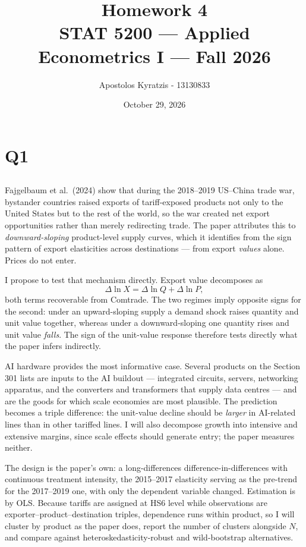 \documentclass[11pt]{article}
\title{\vspace{-2em}Homework 4\\[0.3em]
       \large STAT 5200 --- Applied Econometrics I --- Fall 2026}
\author{Apostolos Kyratzis - 13130833}
\date{October 29, 2026}
\begin{document}
\maketitle

\section{Q1}
\label{sec:q1}

\subsection{}
Fajgelbaum et al.\ (2024) show that during the 2018--2019 US--China trade war,
bystander countries raised exports of tariff-exposed products not only to the
United States but to the rest of the world, so the war created net export
opportunities rather than merely redirecting trade. The paper attributes this
to \emph{downward-sloping} product-level supply curves, which it identifies
from the sign pattern of export elasticities across destinations --- from
export \emph{values} alone. Prices do not enter.

I propose to test that mechanism directly. Export value decomposes as
\[
\Delta \ln X = \Delta \ln Q + \Delta \ln P ,
\]
both terms recoverable from Comtrade. The two regimes imply opposite signs for
the second: under an upward-sloping supply a demand shock raises quantity and
unit value together, whereas under a downward-sloping one quantity rises and
unit value \emph{falls}. The sign of the unit-value response therefore tests
directly what the paper infers indirectly.

AI hardware provides the most informative case. Several products on the
Section 301 lists are inputs to the AI buildout --- integrated circuits,
servers, networking apparatus, and the converters and transformers that supply
data centres --- and are the goods for which scale economies are most
plausible. The prediction becomes a triple difference: the unit-value decline
should be \emph{larger} in AI-related lines than in other tariffed lines. I
will also decompose growth into intensive and extensive margins, since scale
effects should generate entry; the paper measures neither.

The design is the paper's own: a long-differences difference-in-differences
with continuous treatment intensity, the 2015--2017 elasticity serving as the
pre-trend for the 2017--2019 one, with only the dependent variable changed.
Estimation is by OLS. Because tariffs are assigned at HS6 level while
observations are exporter--product--destination triples, dependence runs within
product, so I will cluster by product as the paper does, report the number of
clusters alongside $N$, and compare against heteroskedasticity-robust and
wild-bootstrap alternatives.
\end{document}
